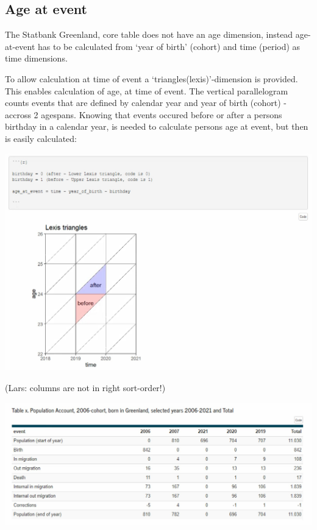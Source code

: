 \documentclass[USenglish]{article}
\begin{document}
\subsection{Age at event} 

The Statbank Greenland, core table does not have an age dimension, instead age-at-event has to be calculated from ‘year of birth’ (cohort) and time (period) as time dimensions.

To allow calculation at time of event a ‘triangles(lexis)’-dimension is provided. This enables calculation of age, at time of event. The vertical parallelogram counts events that are defined by calendar year and year of birth (cohort) - accross 2 agespans. Knowing that events occured before or after a persons birthday in a calendar year, is needed to calculate persons age at event, but then is easily calculated:

\includegraphics[scale=0.25]{images/PopulationAccountLexis}


(Lars: columns are not in right sort-order!)

\includegraphics[scale=0.22]{images/PopulationAccountTabX}
\end{document}
